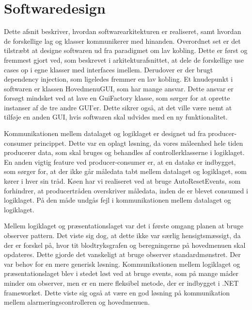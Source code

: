 \section{Softwaredesign}
Dette afsnit beskriver, hvordan softwarearkitekturen er realiseret, samt hvordan de forskellige lag og klasser kommunikerer med hinanden. Overordnet set er det tilstræbt at designe softwaren ud fra paradigmet om lav kobling. Dette er først og fremmest gjort ved, som beskrevet i arkitekturafsnittet, at dele de forskellige use cases op i egne klasser med interfaces imellem. Derudover er der brugt dependency injection, som ligeledes fremmer en lav kobling. Et knudepunkt i softwaren er klassen HovedmenuGUI, som har mange ansvar. Dette ansvar er forsøgt mindsket ved at lave en GuiFactory klasse, som sørger for at oprette instanser af de tre andre GUI'er. Dette sikrer også, at det ville være nemt at tilføje en anden GUI, hvis softwaren skal udvides med en ny funktionalitet. 

Kommunikationen mellem datalaget og logiklaget er designet ud fra producer-consumer princippet. Dette var en oplagt løsning, da vores måleenhed hele tiden producerer data, som skal bruges og behandles af controllerklasserne i logiklaget. En anden vigtig feature ved producer-consumer er, at en datakø er indbygget, som sørger for, at der ikke går måledata tabt mellem datalaget og logiklaget, som kører i hver sin tråd. Køen har vi realiseret ved at bruge AutoResetEvents, som forhindrer, at producertråden overskriver måledata, inden de er blevet consumed i logiklaget. På den måde undgås fejl i kommunikationen mellem datalaget og logiklaget. 

Mellem logiklaget og præsentationslaget var det i første omgang planen at bruge observer pattern. Det viste sig dog, at dette ikke var særlig hensigtsmæssigt, da der er forskel på, hvor tit blodtryksgrafen og beregningerne på hovedmenuen skal opdateres. Dette gjorde det vanskeligt at bruge observer standardmønstret. Der var behov for en mere generisk løsning. Kommunikationen mellem logiklaget og præsentationslaget blev i stedet løst ved at bruge events, som på mange måder minder om observer, men er en mere fleksibel metode, der er indbygget i .NET frameworket. Dette viste sig også at være en god løsning på kommunikation mellem alarmeringscontrolleren og hovedmenuen. 

